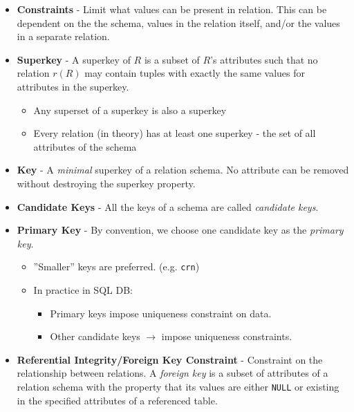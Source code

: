 \documentclass{../cheatsheet}
\begin{document}
\begin{multicols*}{2}
\begin{itemize}
        \item \textbf{Constraints} -
            Limit what values can be present in relation. This can be dependent
            on the the schema, values in the relation itself, and/or the values in a
            separate relation.

        \item \textbf{Superkey} -
            A superkey of $R$ is a subset of $R$'s
            attributes such that no relation $r(R)$ may contain tuples with
            exactly the same values for attributes in the superkey.
            \begin{itemize}
                \item Any superset of a superkey is also a superkey
                \item Every relation (in theory) has at least one superkey - the
                    set of all attributes of the schema
            \end{itemize}

        \item \textbf{Key} - A \textit{minimal} superkey of a relation schema.
            No attribute can be removed without destroying the superkey property.

        \item \textbf{Candidate Keys} - All the keys of a schema are called
            \textit{candidate keys}.

        \item \textbf{Primary Key} - By convention, we choose one candidate key
            as the \textit{primary key}.

            \begin{itemize}
                \item ''Smaller'' keys are preferred. (e.g. \texttt{crn})
                \item In practice in SQL DB:
                    \begin{itemize}
                        \item Primary keys impose uniqueness constraint on data.
                        \item Other candidate keys $\rightarrow$ impose
                            uniqueness constraints.
                    \end{itemize}
            \end{itemize}

        \item \textbf{Referential Integrity/Foreign Key Constraint} - Constraint
            on the relationship between relations. A \textit{foreign key} is a
            subset of attributes of a relation schema with the property that its
            values are either \texttt{NULL} or existing in the specified
            attributes of a referenced table.
    \end{itemize}


\end{multicols*}
\end{document}
